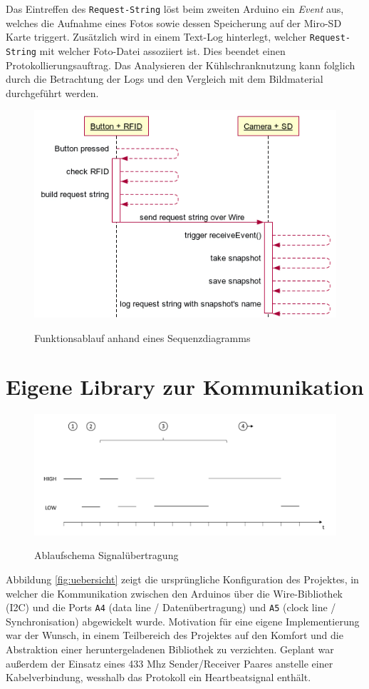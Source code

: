 \documentclass[a4paper, 11pt]{article}
\begin{document}
\noindent Das Eintreffen des \texttt{Request-String} löst beim zweiten Arduino ein \textit{Event} aus, welches die Aufnahme eines Fotos sowie dessen Speicherung auf der Miro-SD Karte triggert. Zusätzlich wird in einem Text-Log hinterlegt, welcher \texttt{Request-String} mit welcher Foto-Datei assoziiert ist. Dies beendet einen Protokollierungsauftrag. Das Analysieren der Kühlschranknutzung kann folglich durch die Betrachtung der Logs und den Vergleich mit dem Bildmaterial durchgeführt werden. 

\begin{figure}[htb]
\centering
    {\includegraphics[width=.9\textwidth]{sequenz1.png}}
    \caption{Funktionsablauf anhand eines Sequenzdiagramms\label{fig:sequenz}}
\centering
\end{figure}


\section{Eigene Library zur Kommunikation}
\begin{figure}[htb]
    \centering
        {\includegraphics[width=1\textwidth]{signal.pdf}}
        \caption{Ablaufschema Signalübertragung \label{fig:signal}}
    \centering
\end{figure}
Abbildung \ref{fig:uebersicht} zeigt die ursprüngliche Konfiguration des Projektes, in welcher die Kommunikation zwischen den Arduinos über die Wire-Bibliothek (I2C) und die Ports \texttt{A4} (data line / Datenübertragung) und \texttt{A5} (clock line / Synchronisation) abgewickelt wurde. Motivation für eine eigene Implementierung war der Wunsch, in einem Teilbereich des Projektes auf den Komfort und die Abstraktion einer heruntergeladenen Bibliothek zu verzichten. Geplant war außerdem der Einsatz eines 433 Mhz Sender/Receiver Paares anstelle einer Kabelverbindung, wesshalb das Protokoll ein Heartbeatsignal enthält.
\end{document}
